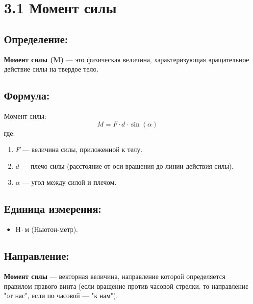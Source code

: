 \documentclass[a4paper,12pt]{article}
\begin{document}
\begin{center}
\end{center}

\vspace{-2.5em}

\section*{3.1 Момент силы}
\vspace{-9pt}
\subsection*{Определение:}
\vspace{-3pt}
\textbf{Момент силы (M)} — это физическая величина, характеризующая вращательное действие силы на твердое тело.

\vspace{-9pt}
\subsection*{Формула:}
\vspace{-3pt}
Момент силы:
\vspace{-0.05em}
$$ M = F \cdot d \cdot \sin(\alpha) $$
где:
\begin{enumerate} [itemsep=0pt, topsep=0pt, parsep=0pt]
  \item $F$ — величина силы, приложенной к телу.
  \item $d$ — плечо силы (расстояние от оси вращения до линии действия силы).
  \item $\alpha$ — угол между силой и плечом.
\end{enumerate}

\vspace{-9pt}
\subsection*{Единица измерения:}
\vspace{-3pt}
\begin{itemize} [itemsep=0pt, topsep=0pt, parsep=0pt]
  \item $Н \cdot м$ (Ньютон-метр).
\end{itemize}

\vspace{-9pt}
\subsection*{Направление:}
\vspace{-3pt}
\textbf{Момент силы} — векторная величина, направление которой определяется правилом правого винта (если вращение против часовой стрелки, то направление "от нас", если по часовой — "к нам").
\end{document}
